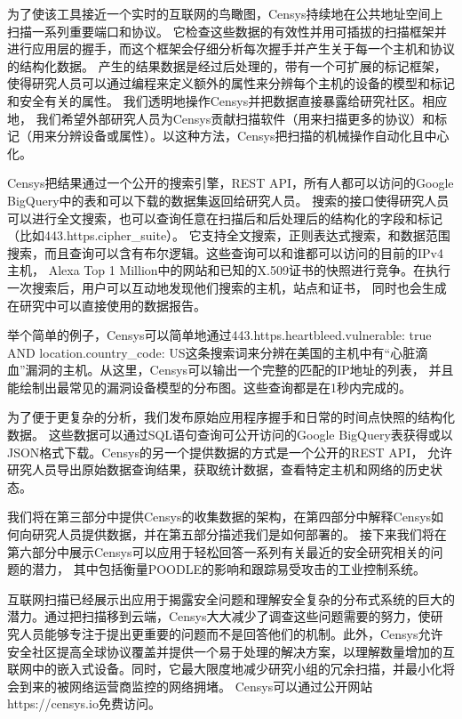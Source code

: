 为了使该工具接近一个实时的互联网的鸟瞰图，Censys持续地在公共地址空间上扫描一系列重要端口和协议。
它检查这些数据的有效性并用可插拔的扫描框架并进行应用层的握手，而这个框架会仔细分析每次握手并产生关于每一个主机和协议的结构化数据。
产生的结果数据是经过后处理的，带有一个可扩展的标记框架，使得研究人员可以通过编程来定义额外的属性来分辨每个主机的设备的模型和标记和安全有关的属性。
我们透明地操作Censys并把数据直接暴露给研究社区。相应地，
我们希望外部研究人员为Censys贡献扫描软件（用来扫描更多的协议）和标记（用来分辨设备或属性）。以这种方法，Censys把扫描的机械操作自动化且中心化。

Censys把结果通过一个公开的搜索引擎，REST API，所有人都可以访问的Google BigQuery中的表和可以下载的数据集返回给研究人员。
搜索的接口使得研究人员可以进行全文搜索，也可以查询任意在扫描后和后处理后的结构化的字段和标记（比如443.https.cipher\_suite）。
它支持全文搜索，正则表达式搜索，和数据范围搜索，而且查询可以含有布尔逻辑。这些查询可以和谁都可以访问的目前的IPv4主机，
Alexa Top 1 Million中的网站和已知的X.509证书的快照进行竞争。在执行一次搜索后，用户可以互动地发现他们搜索的主机，站点和证书，
同时也会生成在研究中可以直接使用的数据报告。

举个简单的例子，Censys可以简单地通过443.https.heartbleed.vulnerable: true AND location.country\_code: 
US这条搜索词来分辨在美国的主机中有“心脏滴血”漏洞的主机。从这里，Censys可以输出一个完整的匹配的IP地址的列表，
并且能绘制出最常见的漏洞设备模型的分布图。这些查询都是在1秒内完成的。

为了便于更复杂的分析，我们发布原始应用程序握手和日常的时间点快照的结构化数据。 
这些数据可以通过SQL语句查询可公开访问的Google BigQuery表获得或以JSON格式下载。Censys的另一个提供数据的方式是一个公开的REST API，
允许研究人员导出原始数据查询结果，获取统计数据，查看特定主机和网络的历史状态。

我们将在第三部分中提供Censys的收集数据的架构，在第四部分中解释Censys如何向研究人员提供数据，并在第五部分描述我们是如何部署的。
接下来我们将在第六部分中展示Censys可以应用于轻松回答一系列有关最近的安全研究相关的问题的潜力，
其中包括衡量POODLE的影响和跟踪易受攻击的工业控制系统。

互联网扫描已经展示出应用于揭露安全问题和理解安全复杂的分布式系统的巨大的潜力。通过把扫描移到云端，Censys大大减少了调查这些问题需要的努力，使研究人员能够专注于提出更重要的问题而不是回答他们的机制。此外，Censys允许安全社区提高全球协议覆盖并提供一个易于处理的解决方案，以理解数量增加的互联网中的嵌入式设备。同时，它最大限度地减少研究小组的冗余扫描，并最小化将会到来的被网络运营商监控的网络拥堵。
Censys可以通过公开网站https://censys.io免费访问。


